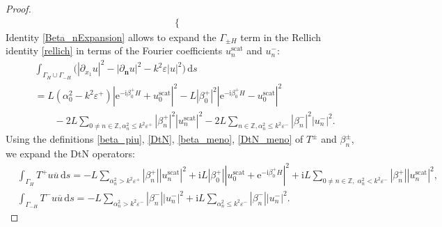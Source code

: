 \documentclass[a4paper,10pt]{article}
\newcommand{\IZ}{{\mathbb Z}}
\newcommand{\bn}{{\mathbf n}}
\newcommand{\ri}{{\mathrm i}}
\newcommand{\re}{{\mathrm e}}
\newcommand{\rd}{{\,\mathrm d}}
\newcommand{\scat}{{\mathrm{scat}}}
\newcommand{\dn}{{\partial_\bn}}
\newcommand{\dxo}{{\partial_{x_1}}}
\newcommand{\cu}{{\overline{u}}}
\newcommand{\GH}{{\Gamma_H}}
\newcommand{\GmH}{{\Gamma_{-H}}}
\newcommand{\GpmH}{{\Gamma_{\pm H}}}
\begin{document}
\begin{proof}
\begin{align*}
\begin{cases}
	\end{cases}%
\end{align*}
Identity \eqref{Beta_nExpansion} allows to expand the $\GpmH$ term in the Rellich identity \eqref{rellich} in terms of the Fourier coefficients $u_n^\scat$ and $u_n^-$:
\begin{align*}
	&\int_{\GH\cup \GmH} \biggl(\left| \dxo u \right|^2 - \left| \dn u \right|^2 -k^2\varepsilon |u|^2 \biggr) \rd s \\
	&= L(\alpha_0^2-k^2\varepsilon^+)|\re^{-\ri \beta_0^+H}+u_0^\scat|^2
	-L|\beta_0^+|^2|\re^{-\ri \beta_0^+H}-u_0^\scat|^2\\
	&\qquad-2L \sum_{0\neq n \in \IZ, \alpha_n^2 \leq k^2\varepsilon^+} |\beta_n^+|^2 {|u_n^\scat|^2}
	- 2L \sum_{n \in \IZ, \alpha_n^2 \leq k^2\varepsilon^-} |\beta_n^-|^2|u^-_n|^2.
\end{align*}
Using the definitions \eqref{beta_piu}, \eqref{DtN}, \eqref{beta_meno}, \eqref{DtN_meno} of $T^\pm$ and $\beta_n^\pm$, we expand the DtN operators:
\begin{align*}
	&\int_{\GH} T^+ u\cu\rd s
	=-L\sum_{\alpha^2_n > k^2\varepsilon^+} |\beta_n^+||u_n^\scat|^2
	+\ri L |\beta_0^+||u_0^\scat+\re^{-\ri \beta_0^+H}|^2
	+\ri L\!\!\sum_{0\ne n\in\IZ,\;\alpha^2_n < k^2\varepsilon^-}\!\!\! |\beta_n^+||u_n^\scat|^2 ,
	\\
	&\int_\GmH T^- u\cu\rd s
	=-L\sum_{\alpha^2_n > k^2\varepsilon^-} |\beta_n^-||u_n^-|^2
	+\ri L\sum_{\alpha^2_n \leq k^2\varepsilon^-} |\beta_n^-||u_n^-|^2 .
\end{align*}


\end{proof}
\end{document}
